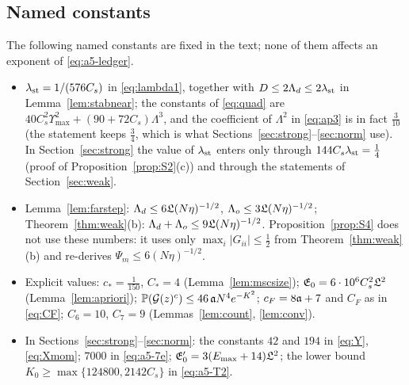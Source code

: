 \subsection{Named constants}\label{app:consts}
The following named constants are fixed in the text; none of them affects an exponent of \eqref{eq:a5-ledger}.
\begin{itemize}[leftmargin=2em,itemsep=1pt]
\item $\lambda_{\rm st}=1/(576C_s)$ in \eqref{eq:lambda1}, together with $D\le2\Lambda_d\le2\lambda_{\rm st}$ in Lemma~\ref{lem:stabnear}; the constants of \eqref{eq:quad} are $40C_s^2\Upsilon_{\max}^2+(90+72C_s)\Lambda^3$, and the coefficient of $\Lambda^2$ in \eqref{eq:ap3} is in fact $\frac3{10}$ (the statement keeps $\frac34$, which is what Sections~\ref{sec:strong}--\ref{sec:norm} use).
In Section~\ref{sec:strong} the value of $\lambda_{\rm st}$ enters only through $144C_s\lambda_{\rm st}=\frac14$ (proof of Proposition~\ref{prop:S2}(c)) and through the statements of Section~\ref{sec:weak}.
\item Lemma~\ref{lem:farstep}: $\Lambda_d\le6\mathfrak{L}(N\eta)^{-1/2}$, $\Lambda_o\le3\mathfrak{L}(N\eta)^{-1/2}$; Theorem~\ref{thm:weak}(b): $\Lambda_d+\Lambda_o\le9\mathfrak{L}(N\eta)^{-1/2}$. Proposition~\ref{prop:S4} does not use these numbers: it uses only $\max_i|G_{ii}|\le\frac12$ from Theorem~\ref{thm:weak}(b) and re-derives $\Psi_m\le6(N\eta)^{-1/2}$.
\item Explicit values: $c_*=\frac1{150}$, $C_*=4$ (Lemma~\ref{lem:mscsize}); $\mathfrak E_0=6\cdot10^6C_s^2\mathfrak{L}^2$ (Lemma~\ref{lem:apriori}); $\mathbb{P}(\mathcal{G}(z)^c)\le46\,\mathfrak{a} N^4e^{-K^2}$; $c_F=8\mathfrak{a}+7$ and $C_F$ as in \eqref{eq:CF}; $C_6=10$, $C_7=9$ (Lemmas~\ref{lem:count}, \ref{lem:conv}).
\item In Sections~\ref{sec:strong}--\ref{sec:norm}: the constants $42$ and $194$ in \eqref{eq:Y}, \eqref{eq:Xmom}; $7000$ in \eqref{eq:a5-7e}; $\mathfrak E_0'=3(E_{\max}+14)\mathfrak{L}^2$; the lower bound $K_0\ge\max\{124800,2142C_s\}$ in \eqref{eq:a5-T2}.
\end{itemize}
